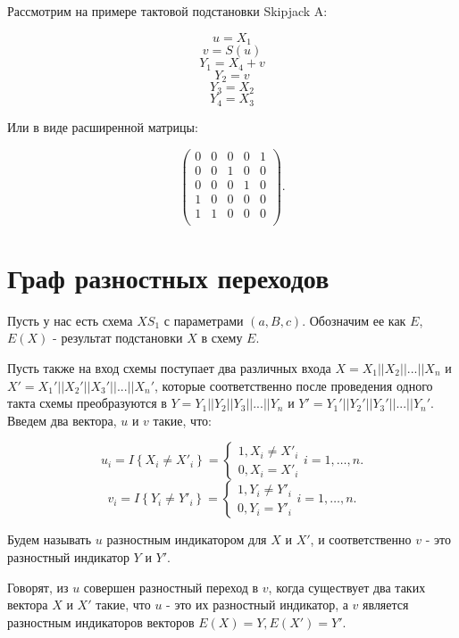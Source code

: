 \documentclass[a4paper,12pt]{extarticle}
\theoremstyle{plain} %
\begin{document}
\begin{large}
Рассмотрим на примере тактовой подстановки Skipjack A:

$$u = X_1$$
$$v = S(u)$$
$$Y_1 = X_4 + v$$
$$Y_2 = v$$
$$Y_3 = X_2$$
$$Y_4 = X_3$$

Или в виде расширенной матрицы:

$$
\begin{pmatrix}
0 & 0 & 0 & 0 & 1\\
0 & 0 & 1 & 0 & 0\\
0 & 0 & 0 & 1 & 0\\
1 & 0 & 0 & 0 & 0\\
1    & 1    & 0 & 0    & 0\\
\end{pmatrix}.
$$

\newpage
\section{Граф разностных переходов}
\vspace*{1cm}

Пусть у нас есть схема $XS_1$ с параметрами $(a, B, c)$. Обозначим ее как $E$,  $E(X)$ - результат подстановки $X$ в схему $E$. 

Пусть также на вход схемы поступает два различных входа $X=X_1||X_2||...||X_n$ и $X'=X_1'||X_2'||X_3'||...||X_n'$, которые соответственно после проведения одного такта схемы преобразуются в $Y=Y_1||Y_2||Y_3||...||Y_n$ и $Y'=Y_1'||Y_2'||Y_3'||...||Y_n'$. Введем два вектора, $u$ и $v$ такие, что:

\begin{equation}
u_i=I\left\{X_i\ne X'_i\right\}=\left\{ \begin{array}{c}
1,X_i\ne X'_i \\
0,X_i=X'_i \end{array}
\right.i=1,\dots , n.
\end{equation}
\begin{equation}
v_i=I\left\{Y_i\ne Y'_i\right\}=\left\{ \begin{array}{c}
1,Y_i\ne Y'_i \\
0,Y_i=Y'_i \end{array}
\right.i=1,\dots , n.
\end{equation}

Будем называть $u$ разностным индикатором для $X$ и $X'$, и соответственно $v$ - это разностный индикатор $Y$ и $Y'$.

Говорят, из $u$ совершен разностный переход в $v$, когда существует два таких вектора $X$ и $X'$ такие, что $u$ - это их разностный индикатор, а $v$ является разностным индикаторов векторов $E(X) = Y, E(X') = Y'$.


\end{large}
\end{document}
